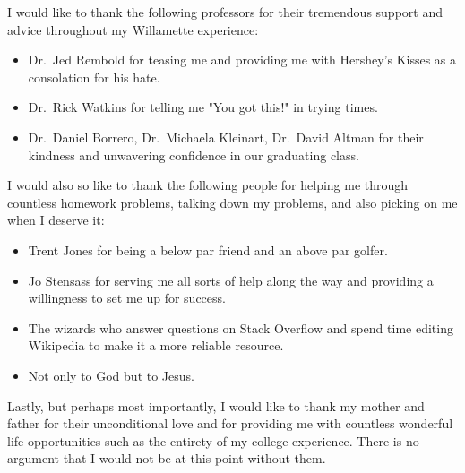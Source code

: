 I would like to thank the following professors for their tremendous support and advice throughout my Willamette experience:
\begin{itemize}
    \item Dr.~Jed Rembold for teasing me and providing me with Hershey's Kisses as a consolation for his hate.
    \item Dr.~Rick Watkins for telling me "You got this!" in trying times.
    \item Dr.~Daniel Borrero, Dr.~Michaela Kleinart, Dr.~David Altman for their kindness and unwavering confidence in our graduating class.
\end{itemize}

I would also so like to thank the following people for helping me through countless homework problems, talking down my problems, and also picking on me when I deserve it:

\begin{itemize}
    \item Trent Jones for being a below par friend and an above par golfer.
    \item Jo Stensass for serving me all sorts of help along the way and providing a willingness to set me up for success.
    \item The wizards who answer questions on Stack Overflow and spend time editing Wikipedia to make it a more reliable resource.
    \item Not only to God but to Jesus.
\end{itemize}

Lastly, but perhaps most importantly, I would like to thank my mother and father for their unconditional love and for providing me with countless wonderful life opportunities such as the entirety of my college experience.  There is no argument that I would not be at this point without them.
